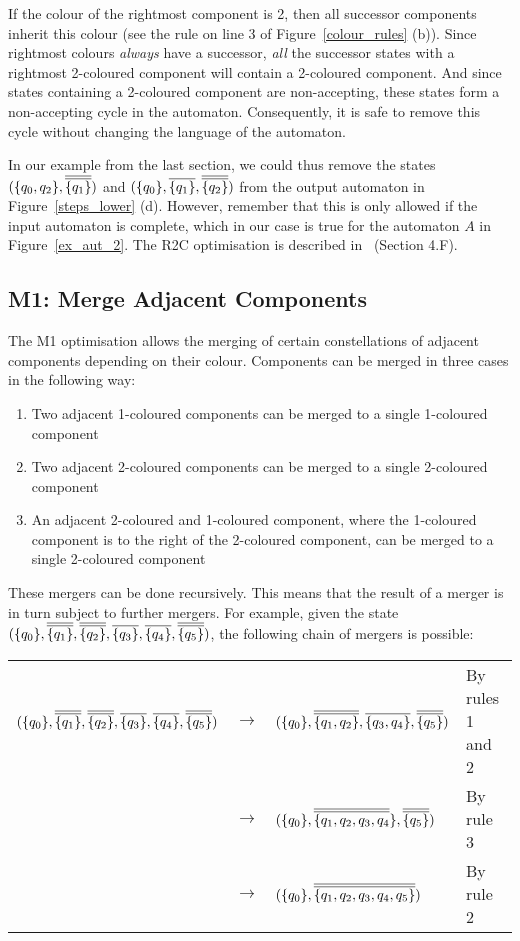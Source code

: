 If the colour of the rightmost component is 2, then all successor components inherit this colour (see the rule on line 3 of Figure~\ref{colour_rules} (b)). Since rightmost colours \textit{always} have a successor, \textit{all} the successor states with a rightmost 2-coloured component will contain a 2-coloured component. And since states containing a 2-coloured component are non-accepting, these states form a non-accepting cycle in the automaton. Consequently, it is safe to remove this cycle without changing the language of the automaton.

In our example from the last section, we could thus remove the states $(\qqm02, \cl2{\qm1})$ and $(\qm0, \cl1{\qm1}, \cl2{\qm2})$ from the output automaton in Figure~\ref{steps_lower} (d). However, remember that this is only allowed if the input automaton is complete, which in our case is true for the automaton $A$ in Figure~\ref{ex_aut_2}. The R2C optimisation is described in~\cite{2014_joel_ulrich} (Section 4.F).


\subsection{M1: Merge Adjacent Components}
The M1 optimisation allows the merging of certain constellations of adjacent components depending on their colour. Components can be merged in three cases in the following way:

\begin{enumerate}
\item Two adjacent 1-coloured components can be merged to a single 1-coloured component
\item Two adjacent 2-coloured components can be merged to a single 2-coloured component
\item An adjacent 2-coloured and 1-coloured component, where the 1-coloured component is to the right of the 2-coloured component, can be merged to a single 2-coloured component
\end{enumerate}

These mergers can be done recursively. This means that the result of a merger is in turn subject to further mergers. For example, given the state $(\qm0, \cl2{\qm1}, \cl2{\qm2}, \cl1{\qm3}, \cl1{\qm4}, \cl2{\qm5})$, the following chain of mergers is possible:

{\renewcommand{\arraystretch}{1.7}
\begin{tabular}{llll}
$(\qm0, \cl2{\qm1}, \cl2{\qm2}, \cl1{\qm3}, \cl1{\qm4}, \cl2{\qm5})$ & $\longrightarrow$ & $(\qm0, \cl2{\{q_1,q_2\}}, \cl1{\{q_3,q_4\}}, \cl2{\qm5})$ &
By rules 1 and 2 \\
& $\longrightarrow$  & $(\qm0, \cl2{\{q_1,q_2,q_3,q_4}\}, \cl2{\qm5})$ &
By rule 3 \\
& $\longrightarrow$ & $(\qm0, \cl2{\{q_1, q_2, q_3, q_4, q_5\}})$ &
By rule 2
\end{tabular}}

